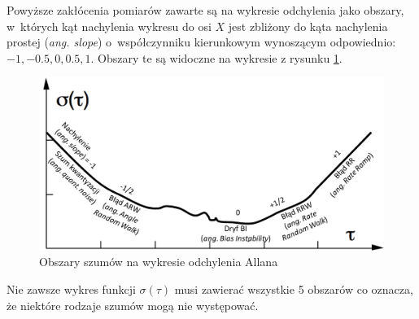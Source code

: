 Powyższe zakłócenia pomiarów zawarte są na wykresie odchylenia jako obszary, w~których kąt nachylenia wykresu do osi $X$ jest zbliżony do kąta nachylenia prostej (\emph{ang. slope}) o~współczynniku kierunkowym wynoszącym odpowiednio: $-1, -0.5, 0, 0.5 , 1$. Obszary te są widoczne na wykresie z rysunku \ref{fig:appx:allan:slopes}.

\begin{savenotes}
	\begin{figure}[!htb]
		\centering
		\includegraphics[width=\linewidth]{images/slopes.png}
		\caption[Obszary szumów na wykresie odchylenia Allana]{Obszary szumów na wykresie odchylenia Allana \cite{s120202219}}
		\label{fig:appx:allan:slopes}
	\end{figure}
\end{savenotes}
				
Nie zawsze wykres funkcji $\sigma(\tau)$ musi zawierać wszystkie 5 obszarów co oznacza, że niektóre rodzaje szumów mogą nie występować.